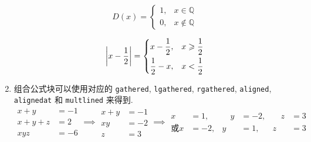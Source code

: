 \documentclass[UTF8,no-math]{ctexart}
\numberwithin{enumi}{section}
\begin{document}
\begin{enumerate}
        \begin{minipage}[c][5em]{0.49\linewidth}
            \begin{equation}
            D(x)=\begin{cases}
            1, & x\in\mathbb{Q} \\ 0, & x\notin\mathbb{Q}
            \end{cases}
            \end{equation}
        \end{minipage}\makebox[0.01\linewidth][r]{\rule[-2.2em]{0.4pt}{5em}}        \begin{minipage}[c][5em]{0.5\linewidth}        
            \begin{equation}
            \left\lvert x-\frac12\right\rvert=\begin{dcases}
            x-\frac12, & x\geqslant \frac12 \\ \frac12-x, &x<\frac12
            \end{dcases}
            \end{equation}
        \end{minipage}
        \item 组合公式块可以使用对应的 \verb|gathered|, \verb|lgathered|, \verb|rgathered|, \verb|aligned|, \verb|alignedat| 和 \verb|multlined| 来得到. 
        \begin{equation}
        \begin{aligned}
        x+y&=-1 \\ x+y+z&=2 \\ xyz&=-6
        \end{aligned} \implies 
        \begin{aligned}
        x+y&=-1 \\ xy&=-2 \\ z&=3 
        \end{aligned} \implies 
        \begin{alignedat}{3}
        x&=1, &\quad y&=-2, &\quad z&=3 \\ 
        \text{或} x&=-2, & y&=1, & z&=3
        \end{alignedat}
        \end{equation}
        

\end{enumerate}
\end{document}
